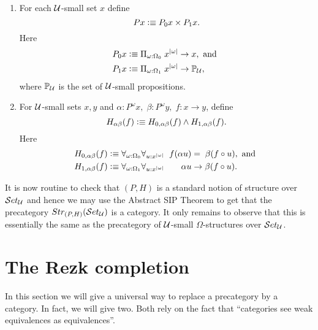 \begin{defn}\label{defn:fo-notion-of-structure}
\mbox{}
\begin{enumerate}
\item For each $\mathcal{U}$-small set $x$ define 
  \[ Px \vcentcolon\equiv P_0x\times P_1x.\]
  Here
  \begin{align*}
    P_0x &\vcentcolon\equiv \Pi_{\omega:\Omega_0}\; x^{|\omega|}\to x, \mbox{ and } \\
    P_1x &\vcentcolon\equiv \Pi_{\omega:\Omega_1}\; x^{|\omega|}\to \mathbb{P}_\mathcal{U},
  \end{align*}
  where $\mathbb{P}_\mathcal{U}$ is the set of $\mathcal{U}$-small propositions.
\item For $\mathcal{U}$-small sets $x,y$ and 
  $\alpha:P^\omega x,\;\beta:P^\omega y,\; f:x\to y$, define
  \[ H_{\alpha\beta}(f) \vcentcolon\equiv H_{0,\alpha\beta}(f)\wedge H_{1,\alpha\beta}(f).\]
  Here
  \begin{align*}
    H_{0,\alpha\beta}(f) &\vcentcolon\equiv
    \forall_{\omega:\Omega_0}\forall_{u:x^{|\omega|}}\;\; f(\alpha u)=\;\beta(f\circ u),
    \mbox{ and }\\
    H_{1,\alpha\beta}(f) &\vcentcolon\equiv
    \forall_{\omega:\Omega_1}\forall_{u:x^{|\omega|}}\;\;\;\;\;\;\;\alpha u\to\beta(f\circ u).
  \end{align*}
\end{enumerate}
\end{defn}

It is now routine to check that $(P,H)$ is a standard notion of structure over $\mathcal{S}et_\mathcal{U}$ and hence we may use the Abstract SIP Theorem to get that the precategory $Str_{(P,H)}(\mathcal{S}et_\mathcal{U})$ is a category.  It only remains to observe that this is essentially the same as the precategory of $\mathcal{U}$-small $\Omega$-structures over $\mathcal{S}et_\mathcal{U}$.


\section{The Rezk completion}
\label{sec:rezk}

In this section we will give a universal way to replace a precategory by a category.
In fact, we will give two.
Both rely on the fact that ``categories see weak equivalences as equivalences''.

